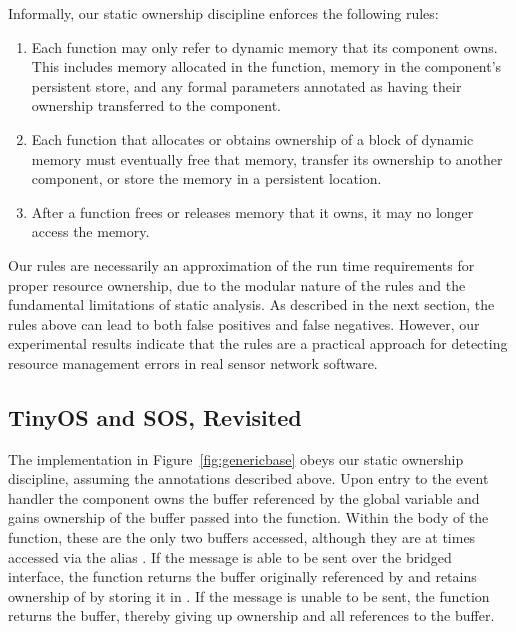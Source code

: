 Informally, our static ownership discipline enforces the following rules:
%
\begin{enumerate}
%
\item Each function may only refer to dynamic memory that its component
owns.  This includes memory allocated in the function, memory in the
component's persistent store, and any formal parameters annotated as having
their ownership transferred to the component.
%
\item Each function that allocates or obtains ownership of a block of
dynamic memory must eventually free that memory, transfer its ownership to
another component, or store the memory in a persistent location.
%
\item After a function frees or releases memory that it owns, it may no
longer access the memory.
%
\end{enumerate}



Our rules are necessarily an approximation of the run time requirements for
proper resource ownership, due to the modular nature of the rules and the
fundamental limitations of static analysis.  
%
As described in the next section, the rules above can lead to both false
positives and false negatives.  
%
However, our experimental results indicate that the rules are a practical
approach for detecting resource management errors in real sensor network
software.



\subsection{TinyOS and SOS, Revisited}



The  implementation in Figure~\ref{fig:genericbase} obeys our
static ownership discipline, assuming the annotations described above. 
%
Upon entry to the  event handler the 
component owns the buffer referenced by the global variable 
and gains ownership of the  buffer passed into the function.
%
Within the body of the function, these are the only two buffers accessed,
although they are at times accessed via the alias .  
%
If the message is able to be sent over the bridged interface, the function
returns the buffer originally referenced by  and retains
ownership of  by storing it in .  
%
If the message is unable to be sent, the function returns the
 buffer, thereby giving up ownership and all references to
the buffer.



